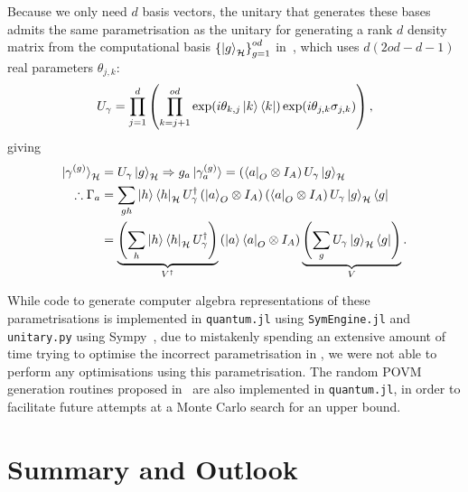 \documentclass[10pt, a4paper]{article}
\numberwithin{equation}{section} %
\theoremstyle{definition}
\theoremstyle{plain}
\newcommand{\?}{\mathrel{?}} %
\newcommand{\Hs}{\mathcal{H}} %
\begin{document}
                        Because we only need \(d\) basis vectors, the unitary that generates these bases admits the same parametrisation as the unitary for generating a rank \(d\) density matrix from the computational basis \({\{\ket{g}_{\Hs}\}}_{g=1}^{od}\) in~\cite{CompositeParam}, which uses \(d(2od-d-1)\) real parameters \(\theta_{j,k}\):
                        \begin{equation}
                          U_{\gamma} = \prod_{j=1}^d \left( \prod_{k=j+1}^{od} \exp(i\theta_{k,j}\ket{k}\bra{k}) \exp(i\theta_{j,k}\sigma_{j,k}) \right),
                        \end{equation}
                        giving
                        \begin{align}
                          \ket{\gamma^{(g)}}_{\Hs} &= U_{\gamma}\ket{g}_{\Hs} \Rightarrow g_a\ket{\gamma^{(g)}_a} = \left(\bra{a}_O \otimes I_A\right)U_{\gamma}\ket{g}_{\Hs} \\
                          \therefore \Gamma_a &= \sum_{gh} \ket{h}\bra{h}_{\Hs} U_{\gamma}^{\dagger} \left(\ket{a}_O \otimes I_A\right) \left(\bra{a}_O \otimes I_A\right)U_{\gamma}\ket{g}_{\Hs}\bra{g} \\
                                              &= \underbrace{\left(\sum_{h} \ket{h}\bra{h}_{\Hs} U_{\gamma}^{\dagger}\right)}_{V^\dagger} \left(\ket{a}\bra{a}_O \otimes I_A\right) \underbrace{\left(\sum_{g} U_{\gamma}\ket{g}_{\Hs}\bra{g}\right)}_{V}.
                        \end{align}

                        While code to generate computer algebra representations of these parametrisations is implemented in \verb`quantum.jl` using \verb`SymEngine.jl` and \verb`unitary.py` using Sympy~\cite{Sympy}, due to mistakenly spending an extensive amount of time trying to optimise the incorrect parametrisation in , we were not able to perform any optimisations using this parametrisation. The random POVM generation routines proposed in~\cite{RandPOVM} are also implemented in \verb`quantum.jl`, in order to facilitate future attempts at a Monte Carlo search for an upper bound.


                        \section{Summary and Outlook}
\end{document}
